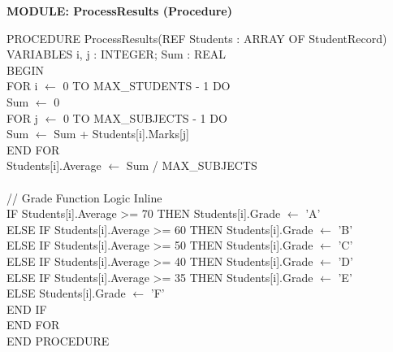 \documentclass[11pt]{article}
\begin{document}
\begin{exoresolu}
\textbf{MODULE: ProcessResults (Procedure)}
\begin{flushleft}
\ttfamily\small
PROCEDURE ProcessResults(REF Students : ARRAY OF StudentRecord)\\
VARIABLES i, j : INTEGER; Sum : REAL\\
BEGIN\\
\hspace{1em}FOR i $\leftarrow$ 0 TO MAX\_STUDENTS - 1 DO\\
\hspace{2em}Sum $\leftarrow$ 0\\
\hspace{2em}FOR j $\leftarrow$ 0 TO MAX\_SUBJECTS - 1 DO\\
\hspace{3em}Sum $\leftarrow$ Sum + Students[i].Marks[j]\\
\hspace{2em}END FOR\\
\hspace{2em}Students[i].Average $\leftarrow$ Sum / MAX\_SUBJECTS\\
\mbox{}\\
\hspace{2em}// Grade Function Logic Inline\\
\hspace{2em}IF Students[i].Average >= 70 THEN Students[i].Grade $\leftarrow$ 'A'\\
\hspace{2em}ELSE IF Students[i].Average >= 60 THEN Students[i].Grade $\leftarrow$ 'B'\\
\hspace{2em}ELSE IF Students[i].Average >= 50 THEN Students[i].Grade $\leftarrow$ 'C'\\
\hspace{2em}ELSE IF Students[i].Average >= 40 THEN Students[i].Grade $\leftarrow$ 'D'\\
\hspace{2em}ELSE IF Students[i].Average >= 35 THEN Students[i].Grade $\leftarrow$ 'E'\\
\hspace{2em}ELSE Students[i].Grade $\leftarrow$ 'F'\\
\hspace{2em}END IF\\
\hspace{1em}END FOR\\
END PROCEDURE
\end{flushleft}


\end{exoresolu}
\end{document}
